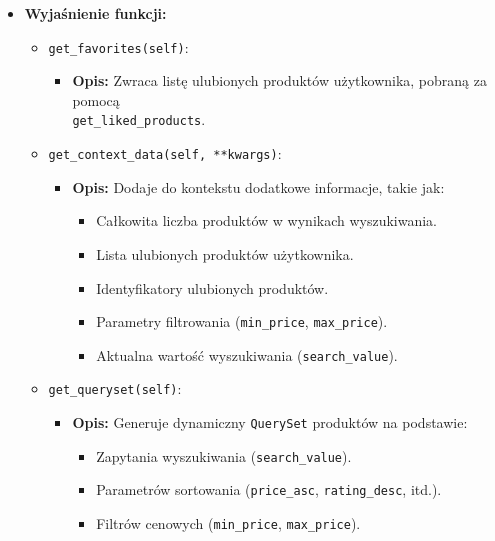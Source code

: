 \documentclass[12pt,a4paper,oneside]{article}
\theoremstyle{definition}
\numberwithin{equation}{section}
\begin{document}
\begin{itemize}
    \item \textbf{Wyjaśnienie funkcji:}
        \begin{itemize}
            \item \texttt{get\_favorites(self)}:
            \begin{itemize}
                \item \textbf{Opis:} Zwraca listę ulubionych produktów użytkownika, pobraną za pomocą\\ \texttt{get\_liked\_products}.
            \end{itemize}
            \item \texttt{get\_context\_data(self, **kwargs)}:
            \begin{itemize}
                \item \textbf{Opis:} Dodaje do kontekstu dodatkowe informacje, takie jak:
                \begin{itemize}
                    \item Całkowita liczba produktów w wynikach wyszukiwania.
                    \item Lista ulubionych produktów użytkownika.
                    \item Identyfikatory ulubionych produktów.
                    \item Parametry filtrowania (\texttt{min\_price}, \texttt{max\_price}).
                    \item Aktualna wartość wyszukiwania (\texttt{search\_value}).
                \end{itemize}
            \end{itemize}
            \item \texttt{get\_queryset(self)}:
            \begin{itemize}
                \item \textbf{Opis:} Generuje dynamiczny \texttt{QuerySet} produktów na podstawie:
                \begin{itemize}
                    \item Zapytania wyszukiwania (\texttt{search\_value}).
                    \item Parametrów sortowania (\texttt{price\_asc}, \texttt{rating\_desc}, itd.).
                    \item Filtrów cenowych (\texttt{min\_price}, \texttt{max\_price}).
                \end{itemize}
            \end{itemize}
        \end{itemize}


\end{itemize}
\end{document}
